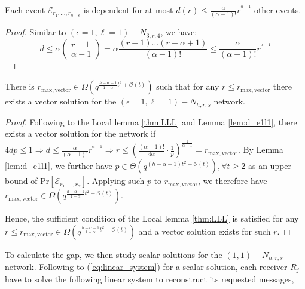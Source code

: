 \begin{lem}
Each event $\mathcal{E}_{r_{1},\ldots,r_{h-\epsilon}}$ is dependent
for at most $d\left(r\right)\leq\frac{\alpha}{\left(\alpha-1\right)!}r^{^{\alpha-1}}$
other events. \label{lem:d_e1l1}
\end{lem}
\begin{proof}
Similar to $\left(\epsilon=1,\ell=1\right)-\ensuremath{N}_{3,r,4}$,
we have:
\[
d\leq\alpha\left(\begin{array}{c}
r-1\\
\alpha-1
\end{array}\right)=\alpha\frac{\left(r-1\right)\ldots\left(r-\alpha+1\right)}{\left(\alpha-1\right)!}\leq\frac{\alpha}{\left(\alpha-1\right)!}r^{^{\alpha-1}}
\]
\end{proof}
\begin{thm}
There is $r_{\mathrm{max,vector}}\in\Omega\left(q^{\frac{h-\alpha-1}{1-\alpha}t^{2}+\mathcal{O}(t)}\right)$
such that for any $r\leq r_{\mathrm{max,vector}}$ there exists a
vector solution for the $\left(\epsilon=1,\ell=1\right)-\ensuremath{N}_{h,r,s}$
network. \label{theo:r_vector_e1l1}
\end{thm}
\begin{proof}
Following to the Local lemma \ref{thm:LLL} and Lemma \ref{lem:d_e1l1},
there exists a vector solution for the network if $4dp\leq1\Rightarrow d\leq\frac{\alpha}{\left(\alpha-1\right)!}r^{^{\alpha-1}}\Rightarrow r\leq\left(\frac{\left(\alpha-1\right)!}{4\alpha}\cdot\frac{1}{p}\right)^{\frac{1}{\alpha-1}}=r_{\mathrm{max,vector}}$.
By Lemma \ref{lem:d_e1l1}, we further have $p\in\Theta\left(q^{\left(h-\alpha-1\right)t^{2}+\mathcal{O}(t)}\right),\forall t\geq2$
as an upper bound of $\mathrm{Pr}\left[\mathcal{E}_{r_{1},\ldots,r_{\alpha}}\right]$.
Applying such $p$ to $r_{\mathrm{max,vector}}$, we therefore have
$r_{\mathrm{max,vector}}\in\Omega\left(q^{\frac{h-\alpha-1}{1-\alpha}t^{2}+\mathcal{O}(t)}\right)$.

Hence, the sufficient condition of the Local lemma \ref{thm:LLL}
is satisfied for any $r\leq r_{\mathrm{max,vector}}\in\Omega\left(q^{\frac{h-\alpha-1}{1-\alpha}t^{2}+\mathcal{O}(t)}\right)$
and a vector solution exists for such $r$.
\end{proof}
To calculate the gap, we then study scalar solutions for the $\left(1,1\right)-\ensuremath{N}_{h,r,s}$
network. Following to (\ref{eq:linear_system}) for a scalar solution,
each receiver $R_{j}$ have to solve the following linear system to
reconstruct its requested messages,


